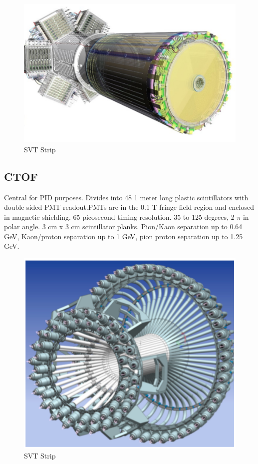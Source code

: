 		        
		        						
									
			 \begin{figure}[H]
    			\centering
    			\includegraphics[width=12cm]{CLAS-12/modules/clas-12-system/pics/cd/MVT.PNG}
    			\caption{SVT Strip}
			\end{figure}
 
    
        \subsection{CTOF}
            Central for PID purposes. Divides into 48 1 meter long plastic scintillators with double sided PMT readout.PMTs are in the 0.1 T fringe field region and enclosed in magnetic shielding. 65 picosecond timing resolution. 35 to 125 degrees, 2 $\pi$ in polar angle. 3 cm x 3 cm scintillator planks. Pion/Kaon separation up to 0.64 GeV, Kaon/proton separation up to 1 GeV, pion proton separation up to 1.25 GeV.  
            
            						
			 \begin{figure}[H]
    			\centering
    			\includegraphics[width=12cm]{CLAS-12/modules/clas-12-system/pics/cd/CTOF.PNG}
    			\caption{SVT Strip}
			\end{figure}
            
